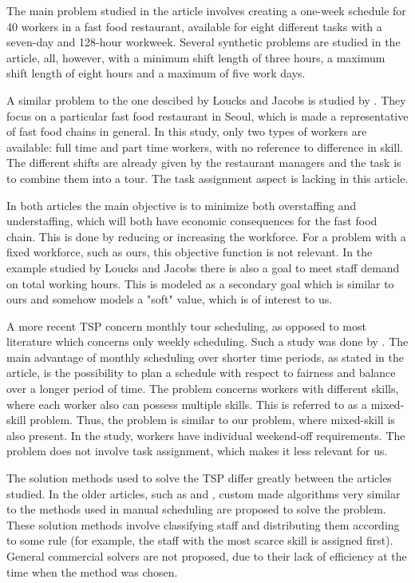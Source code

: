 The main problem studied in the article involves creating a one-week schedule for 40 workers in a fast food restaurant, available for eight different tasks with a seven-day and 128-hour workweek. Several synthetic problems are studied in the article, all, however, with a minimum shift length of three hours, a maximum shift length of eight hours and a maximum of five work days.

A similar problem to the one descibed by Loucks and Jacobs is studied by \citet{choi_hwang_park_2009}. They focus on a particular fast food restaurant in Seoul, which is made a representative of fast food chains in general. In this study, only two types of workers are available: full time and part time workers, with no reference to difference in skill. The different shifts are already given by the restaurant managers and the task is to combine them into a tour. The task assignment aspect is lacking in this article.


In both articles the main objective is to minimize both overstaffing and understaffing, which will both have economic consequences for the fast food chain. This is done by reducing or increasing the workforce. For a problem with a fixed workforce, such as ours, this objective function is not relevant. In the example studied by Loucks and Jacobs there is also a goal to meet staff demand on total working hours. This is modeled as a secondary goal which is similar to ours and somehow models a "soft" value, which is of interest to us.

A more recent TSP concern monthly tour scheduling, as opposed to most literature which concerns only weekly scheduling. Such a study was done by \citet{rong_2010}. The main advantage of monthly scheduling over shorter time periods, as stated in the article, is the possibility to plan a schedule with respect to fairness and balance over a longer period of time. The problem concerns workers with different skills, where each worker also can possess multiple skills. This is referred to as a mixed-skill problem. Thus, the problem is similar to our problem, where mixed-skill is also present. In the study, workers have individual weekend-off requirements. The problem does not involve task assignment, which makes it less relevant for us.

The solution methods used to solve the TSP differ greatly between the articles studied. In the older articles, such as \citet{thompson_1988} and \citet{loucks_1991}, custom made algorithms very similar to the methods used in manual scheduling are proposed to solve the problem. These solution methods involve classifying staff and distributing them according to some rule (for example, the staff with the most scarce skill is assigned first). General commercial solvers are not proposed, due to their lack of efficiency at the time when the method was chosen. 

